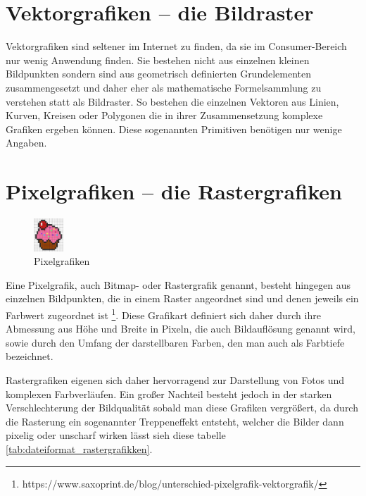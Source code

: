 \section{Vektorgrafiken – die Bildraster}
\label{sec:vektorgrafiken_-_die_bildraster}

Vektorgrafiken sind seltener im Internet zu finden, da sie im Consumer-Bereich nur wenig Anwendung finden. Sie bestehen nicht aus einzelnen kleinen Bildpunkten sondern sind aus geometrisch definierten Grundelementen zusammengesetzt und daher eher als mathematische Formelsammlung zu verstehen statt als Bildraster. So bestehen die einzelnen Vektoren aus Linien, Kurven, Kreisen oder Polygonen die in ihrer Zusammensetzung komplexe Grafiken ergeben können. Diese sogenannten Primitiven benötigen nur wenige Angaben. \\

\section{Pixelgrafiken – die Rastergrafiken}
\label{sec:pixelgrafiken_-_die_rastergrafiken}

\begin{figure}
\centering
\includegraphics[width=0.10\textwidth]{img/k1_pixel_img.jpg}
\caption{\label{fig:frog1}Pixelgrafiken}
\end{figure}

Eine Pixelgrafik, auch Bitmap- oder Rastergrafik genannt, besteht hingegen aus einzelnen Bildpunkten, die in einem Raster angeordnet sind und denen jeweils ein Farbwert zugeordnet ist \footnote[1]{https://www.saxoprint.de/blog/unterschied-pixelgrafik-vektorgrafik/}. Diese Grafikart definiert sich daher durch ihre Abmessung aus Höhe und Breite in Pixeln, die auch Bildauflösung genannt wird, sowie durch den Umfang der darstellbaren Farben, den man auch als Farbtiefe bezeichnet.

\vspace{5mm}

Rastergrafiken eigenen sich daher hervorragend zur Darstellung von Fotos und komplexen Farbverläufen. Ein großer Nachteil besteht jedoch in der starken Verschlechterung der Bildqualität sobald man diese Grafiken vergrößert, da durch die Rasterung ein sogenannter Treppeneffekt entsteht, welcher die Bilder dann pixelig oder unscharf wirken lässt sieh diese tabelle \ref{tab:dateiformat_rastergrafikken}. 


